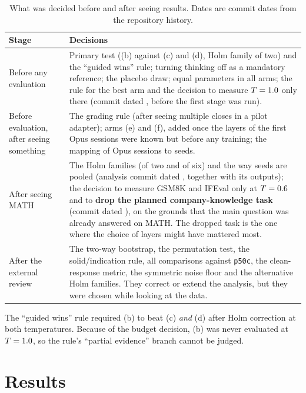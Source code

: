 \documentclass[11pt]{article}
\begin{document}
\begin{table}[htbp]
\centering
\caption{What was decided before and after seeing results. Dates are commit dates from the repository history.}\label{tab:when}
\footnotesize
\begin{tabularx}{\linewidth}{>{\raggedright\arraybackslash}p{.27\linewidth}>{\raggedright\arraybackslash}X}
\toprule
\textbf{Stage} & \textbf{Decisions} \\
\midrule
Before any evaluation & Primary test ((b) against (c) and (d), Holm family of two) and the ``guided wins'' rule; turning thinking off as a mandatory reference; the placebo draw; equal parameters in all arms; the rule for the best arm and the decision to measure $T=1.0$ only there (commit dated \DateBestArmRule{}, before the first stage was run). \\
Before evaluation, after seeing something & The grading rule (after seeing multiple closes in a pilot adapter); arms (e) and (f), added once the layers of the first Opus sessions were known but before any training; the mapping of Opus sessions to seeds. \\
After seeing MATH & The Holm families (of two and of six) and the way seeds are pooled (analysis commit dated \DateHolmFamilies{}, together with its outputs); the decision to measure GSM8K and IFEval only at $T=0.6$ and to \textbf{drop the planned company-knowledge task} (commit dated \DateScopeCut{}), on the grounds that the main question was already answered on MATH. The dropped task is the one where the choice of layers might have mattered most. \\
After the external review & The two-way bootstrap, the permutation test, the solid/indication rule, all comparisons against \texttt{p50c}, the clean-response metric, the symmetric noise floor and the alternative Holm families. They correct or extend the analysis, but they were chosen while looking at the data. \\
\bottomrule
\end{tabularx}
\end{table}

The ``guided wins'' rule required (b) to beat (c) \emph{and} (d) after Holm correction at both temperatures. Because of the budget decision, (b) was never evaluated at $T=1.0$, so the rule's ``partial evidence'' branch cannot be judged.

\section{Results}\label{sec:4}
\end{document}
